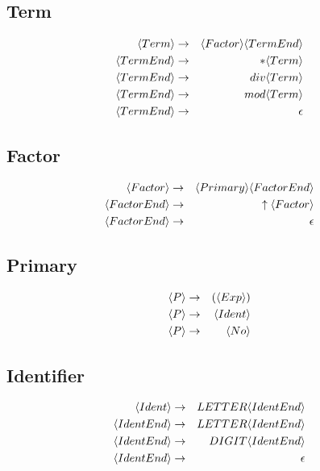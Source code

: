 \documentclass[a4paper,12pt]{article}
\newcommand{\nonterminal}[1]{\langle #1 \rangle}
\begin{document}
\subsection*{Term}
                            
\begin{eqnarray}
\setcounter{equation}{1}
\nonterminal{Term} 		&	\to	&	 \nonterminal{Factor} \nonterminal{TermEnd}	\\
\nonterminal{TermEnd} 	& 	\to	&	 * \nonterminal{Term}	\\
\nonterminal{TermEnd} 	& 	\to	&	 div \nonterminal{Term}	\\
\nonterminal{TermEnd} 	& 	\to	&	 mod \nonterminal{Term}	\\
\nonterminal{TermEnd} 	& 	\to	&	 \epsilon
\end{eqnarray}

\subsection*{Factor}
                            
\begin{eqnarray}
\setcounter{equation}{1}
\nonterminal{Factor} 	&	\to	&	 \nonterminal{Primary}
\nonterminal{FactorEnd}	\\
\nonterminal{FactorEnd} & 	\to	&	 \uparrow \nonterminal{Factor}	\\
\nonterminal{FactorEnd} & 	\to	&	 \epsilon
\end{eqnarray}

\subsection*{Primary}
                            
\begin{eqnarray}
\setcounter{equation}{1}
\nonterminal{P} 			&	\to	&	 \left( \nonterminal{Exp} \right)	\\
\nonterminal{P} 			&	\to	&	 \nonterminal{Ident}	\\
\nonterminal{P} 			&	\to	&	 \nonterminal{No}
\end{eqnarray}
\subsection*{Identifier}

\begin{eqnarray}
\setcounter{equation}{1}
\nonterminal{Ident}		&	\to	&	 LETTER \nonterminal{IdentEnd}	\\
\nonterminal{IdentEnd} 	& 	\to	&	 LETTER \nonterminal{IdentEnd}	\\
\nonterminal{IdentEnd} 	& 	\to	&	 DIGIT \nonterminal{IdentEnd}		\\
\nonterminal{IdentEnd} 	& 	\to	&	 \epsilon
\end{eqnarray}
\end{document}
